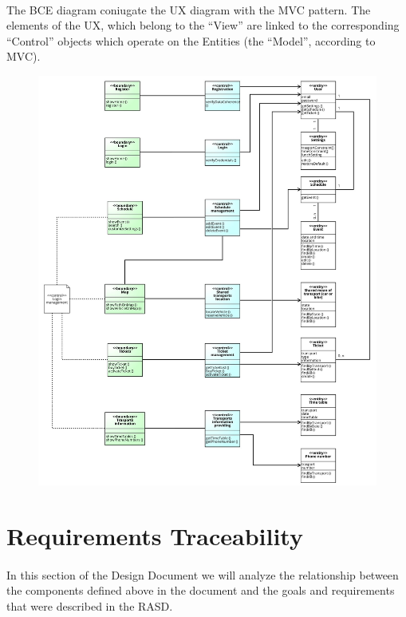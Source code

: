 \documentclass{article}
\begin{document}
			\paragraph{}The BCE diagram coniugate the UX diagram with the MVC pattern. The elements of the UX, which belong to the “View” are linked to the corresponding “Control” objects which operate on the Entities (the “Model”, according to MVC).
			\begin{figure}[H]
			\includegraphics[width=\linewidth]{Images/Mockup/UX_BCE/BCE.jpg}
			\caption{}
			\label{BCE}
			\end{figure}			
	\section{Requirements Traceability}
		\paragraph{}In this section of the Design Document we will analyze the relationship between the components defined above in the document and the goals and requirements that were described in the RASD.
\end{document}
